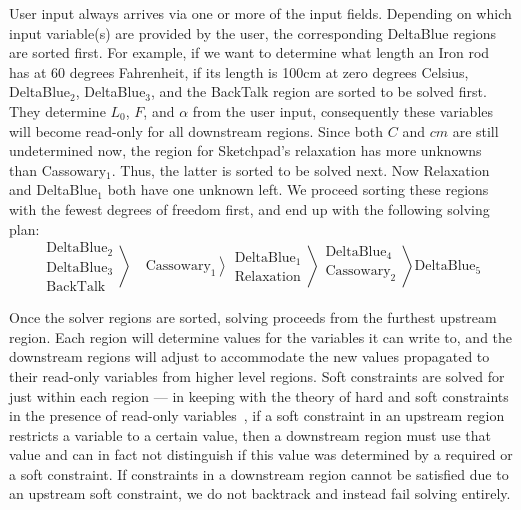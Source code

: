 User input always arrives via one or more of the input fields. Depending on
which input variable(s) are provided by the user, the corresponding DeltaBlue
regions are sorted first. For example, if we want to determine what length an
Iron rod has at 60 degrees Fahrenheit, if its length is 100cm at zero degrees
Celsius, DeltaBlue$_2$, DeltaBlue$_3$, and the BackTalk region are sorted to be
solved first. They determine $L_0$, $F$, and $\alpha$ from the user input,
consequently these variables will become read-only for all downstream
regions. Since both $C$ and $cm$ are still undetermined now, the region for
Sketchpad's relaxation has more unknowns than Cassowary$_1$. Thus, the latter
is sorted to be solved next. Now Relaxation and DeltaBlue$_1$ both have one
unknown left. We proceed sorting these regions with the fewest degrees of
freedom first, and end up with the following solving plan:
\[
  \left.\begin{aligned}
      \text{DeltaBlue}_2\\
      \text{DeltaBlue}_3\\
      \text{BackTalk}
    \end{aligned}\right\rangle
  \left.
    \phantom{\begin{aligned}~\\~\\\end{aligned}}
    \text{Cassowary}_1
  \right\rangle
  \left.\begin{aligned}
      \text{DeltaBlue}_1\\
      \text{Relaxation}
    \end{aligned}\right\rangle
  \left.\begin{aligned}
      \text{DeltaBlue}_4\\
      \text{Cassowary}_2\\
    \end{aligned}\right\rangle
  \text{DeltaBlue}_5
\]

Once the solver regions are sorted, solving proceeds from the furthest upstream
region.  Each region will determine values for the variables it can write to,
and the downstream regions will adjust to accommodate the new values propagated
to their read-only variables from higher level regions. Soft constraints are
solved for just within each region --- in keeping with the theory of hard and
soft constraints in the presence of read-only variables~\cite{borning1992constraint}, if a soft constraint in an upstream region
restricts a variable to a certain value, then a downstream region must use that
value and can in fact not distinguish if this value was determined by a required
or a soft constraint. If constraints in a downstream region cannot be satisfied
due to an upstream soft constraint, we do not backtrack and instead fail solving
entirely.

